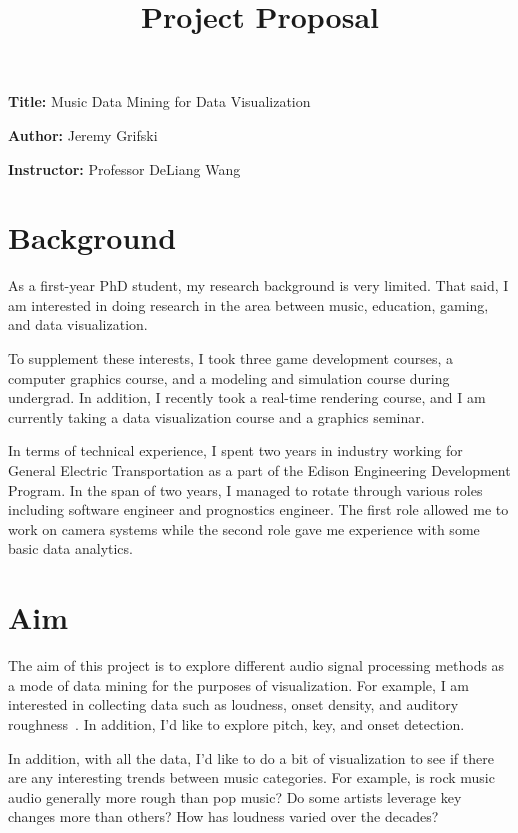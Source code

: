 \documentclass[12pt, a4paper]{article}
\title{Project Proposal}
\author{}
\date{}
\newcommand{\namelistlabel}[1]{\mbox{#1}\hfil}
\newenvironment{namelist}[1]{%
\begin{list}{}
    {
        \let\makelabel\namelistlabel
        \settowidth{\labelwidth}{#1}
        \setlength{\leftmargin}{1.1\labelwidth}
    }
  }{%
\end{list}}
\begin{document}
\maketitle

\begin{namelist}{xxxxxxxxxxxx}
\item[{\bf Title:}]
	Music Data Mining for Data Visualization
\item[{\bf Author:}]
	Jeremy Grifski
\item[{\bf Instructor:}]
	Professor DeLiang Wang
\end{namelist}

\section*{Background}

As a first-year PhD student, my research background is very limited. That said,
I am interested in doing research in the area between music, education, gaming,
and data visualization.

To supplement these interests, I took three game development courses, a
computer graphics course, and a modeling and simulation course during undergrad.
In addition, I recently took a real-time rendering course, and I am
currently taking a data visualization course and a graphics seminar.

In terms of technical experience, I spent two years in industry working for
General Electric Transportation as a part of the Edison Engineering Development
Program. In the span of two years, I managed to rotate through various roles
including software engineer and prognostics engineer. The first role allowed
me to work on camera systems while the second role gave me experience with
some basic data analytics.

\section*{Aim}

The aim of this project is to explore different audio signal processing methods
as a mode of data mining for the purposes of visualization. For example, I am
interested in collecting data such as loudness, onset density, and auditory
roughness~\cite{knuth}. In addition, I'd like to explore pitch, key, and onset
detection.

In addition, with all the data, I'd like to do a bit of visualization to see
if there are any interesting trends between music categories. For example,
is rock music audio generally more rough than pop music? Do some artists
leverage key changes more than others? How has loudness varied over the
decades?
\end{document}
